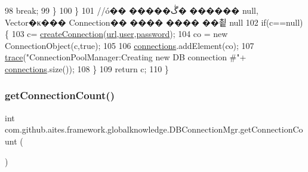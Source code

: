 \begin{DoxyCode}
98                 \textcolor{keywordflow}{break};
99             \}
100         \}
101         \textcolor{comment}{//ó�� �����ڴ� ������ null, Vector�κ��� Connection�� ���� ���� ��쵵 null}
102         \textcolor{keywordflow}{if}(c==null)\{
103             c= \mbox{\hyperlink{classcom_1_1github_1_1aites_1_1framework_1_1globalknowledge_1_1_d_b_connection_mgr_a5000396759d53cd8e80b9951cdf6fda9}{createConnection}}(\mbox{\hyperlink{classcom_1_1github_1_1aites_1_1framework_1_1globalknowledge_1_1_d_b_connection_mgr_a86e734da035245fae5ee3a77ba92d7a9}{url}},\mbox{\hyperlink{classcom_1_1github_1_1aites_1_1framework_1_1globalknowledge_1_1_d_b_connection_mgr_a23c20259e7ddd8b5d7d82aff18db1034}{user}},\mbox{\hyperlink{classcom_1_1github_1_1aites_1_1framework_1_1globalknowledge_1_1_d_b_connection_mgr_a0c6550844ff29a2f303d7ca3f059d535}{password}});
104             co = \textcolor{keyword}{new} ConnectionObject(c,\textcolor{keyword}{true});
105             
106             \mbox{\hyperlink{classcom_1_1github_1_1aites_1_1framework_1_1globalknowledge_1_1_d_b_connection_mgr_a2a178e6371fa020ccca3e12574ef2e14}{connections}}.addElement(co);
107             \mbox{\hyperlink{classcom_1_1github_1_1aites_1_1framework_1_1globalknowledge_1_1_d_b_connection_mgr_ae9ff677183d99acafb2da9cd8ba6de20}{trace}}(\textcolor{stringliteral}{"ConnectionPoolManager:Creating new DB connection #"}+
      \mbox{\hyperlink{classcom_1_1github_1_1aites_1_1framework_1_1globalknowledge_1_1_d_b_connection_mgr_a2a178e6371fa020ccca3e12574ef2e14}{connections}}.size());
108         \}
109         \textcolor{keywordflow}{return} c;
110     \}
\end{DoxyCode}
\mbox{\label{classcom_1_1github_1_1aites_1_1framework_1_1globalknowledge_1_1_d_b_connection_mgr_a7a64007ba60591d2e9554ba0961078eb}} 
\subsubsection{\texorpdfstring{get\+Connection\+Count()}{getConnectionCount()}}
{\footnotesize\ttfamily int com.\+github.\+aites.\+framework.\+globalknowledge.\+D\+B\+Connection\+Mgr.\+get\+Connection\+Count (\begin{DoxyParamCaption}{ }\end{DoxyParamCaption})}



